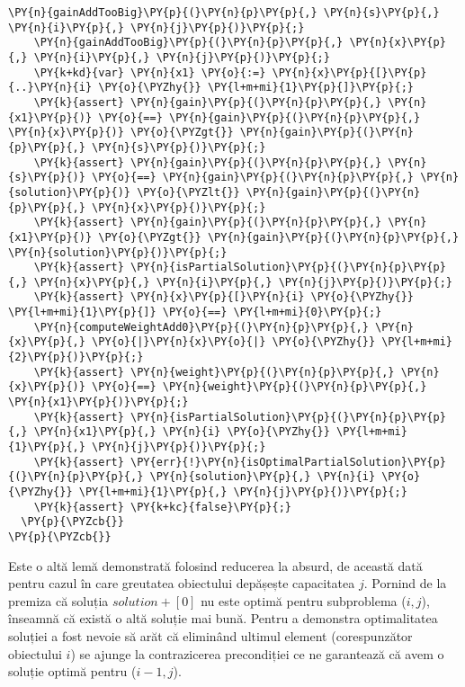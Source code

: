 \begin{sloppypar}
\begin{enumerate}
\begin{Verbatim}[commandchars=\\\{\}]
    \PY{n}{gainAddTooBig}\PY{p}{(}\PY{n}{p}\PY{p}{,} \PY{n}{s}\PY{p}{,} \PY{n}{i}\PY{p}{,} \PY{n}{j}\PY{p}{)}\PY{p}{;}
    \PY{n}{gainAddTooBig}\PY{p}{(}\PY{n}{p}\PY{p}{,} \PY{n}{x}\PY{p}{,} \PY{n}{i}\PY{p}{,} \PY{n}{j}\PY{p}{)}\PY{p}{;}
    \PY{k+kd}{var} \PY{n}{x1} \PY{o}{:=} \PY{n}{x}\PY{p}{[}\PY{p}{..}\PY{n}{i} \PY{o}{\PYZhy{}} \PY{l+m+mi}{1}\PY{p}{]}\PY{p}{;}
    \PY{k}{assert} \PY{n}{gain}\PY{p}{(}\PY{n}{p}\PY{p}{,} \PY{n}{x1}\PY{p}{)} \PY{o}{==} \PY{n}{gain}\PY{p}{(}\PY{n}{p}\PY{p}{,} \PY{n}{x}\PY{p}{)} \PY{o}{\PYZgt{}} \PY{n}{gain}\PY{p}{(}\PY{n}{p}\PY{p}{,} \PY{n}{s}\PY{p}{)}\PY{p}{;}  
    \PY{k}{assert} \PY{n}{gain}\PY{p}{(}\PY{n}{p}\PY{p}{,} \PY{n}{s}\PY{p}{)} \PY{o}{==} \PY{n}{gain}\PY{p}{(}\PY{n}{p}\PY{p}{,} \PY{n}{solution}\PY{p}{)} \PY{o}{\PYZlt{}} \PY{n}{gain}\PY{p}{(}\PY{n}{p}\PY{p}{,} \PY{n}{x}\PY{p}{)}\PY{p}{;}
    \PY{k}{assert} \PY{n}{gain}\PY{p}{(}\PY{n}{p}\PY{p}{,} \PY{n}{x1}\PY{p}{)} \PY{o}{\PYZgt{}} \PY{n}{gain}\PY{p}{(}\PY{n}{p}\PY{p}{,} \PY{n}{solution}\PY{p}{)}\PY{p}{;}
    \PY{k}{assert} \PY{n}{isPartialSolution}\PY{p}{(}\PY{n}{p}\PY{p}{,} \PY{n}{x}\PY{p}{,} \PY{n}{i}\PY{p}{,} \PY{n}{j}\PY{p}{)}\PY{p}{;}
    \PY{k}{assert} \PY{n}{x}\PY{p}{[}\PY{n}{i} \PY{o}{\PYZhy{}} \PY{l+m+mi}{1}\PY{p}{]} \PY{o}{==} \PY{l+m+mi}{0}\PY{p}{;}
    \PY{n}{computeWeightAdd0}\PY{p}{(}\PY{n}{p}\PY{p}{,} \PY{n}{x}\PY{p}{,} \PY{o}{|}\PY{n}{x}\PY{o}{|} \PY{o}{\PYZhy{}} \PY{l+m+mi}{2}\PY{p}{)}\PY{p}{;}
    \PY{k}{assert} \PY{n}{weight}\PY{p}{(}\PY{n}{p}\PY{p}{,} \PY{n}{x}\PY{p}{)} \PY{o}{==} \PY{n}{weight}\PY{p}{(}\PY{n}{p}\PY{p}{,} \PY{n}{x1}\PY{p}{)}\PY{p}{;}
    \PY{k}{assert} \PY{n}{isPartialSolution}\PY{p}{(}\PY{n}{p}\PY{p}{,} \PY{n}{x1}\PY{p}{,} \PY{n}{i} \PY{o}{\PYZhy{}} \PY{l+m+mi}{1}\PY{p}{,} \PY{n}{j}\PY{p}{)}\PY{p}{;}
    \PY{k}{assert} \PY{err}{!}\PY{n}{isOptimalPartialSolution}\PY{p}{(}\PY{n}{p}\PY{p}{,} \PY{n}{solution}\PY{p}{,} \PY{n}{i} \PY{o}{\PYZhy{}} \PY{l+m+mi}{1}\PY{p}{,} \PY{n}{j}\PY{p}{)}\PY{p}{;}
    \PY{k}{assert} \PY{k+kc}{false}\PY{p}{;}
  \PY{p}{\PYZcb{}}
\PY{p}{\PYZcb{}}
\end{Verbatim}
     Este o altă lemă demonstrată folosind reducerea la absurd, de această dată pentru cazul în care greutatea obiectului depășește capacitatea $j$. Pornind de la premiza că soluția $solution + [0]$ nu este optimă pentru subproblema ($i, j$), înseamnă că există o altă soluție mai bună. Pentru a demonstra optimalitatea soluției a fost nevoie să arăt că eliminând ultimul element (corespunzător obiectului $i$) se ajunge la contrazicerea precondiției ce ne garantează că avem o soluție optimă pentru ($i - 1, j$).

\end{enumerate}
\end{sloppypar}
